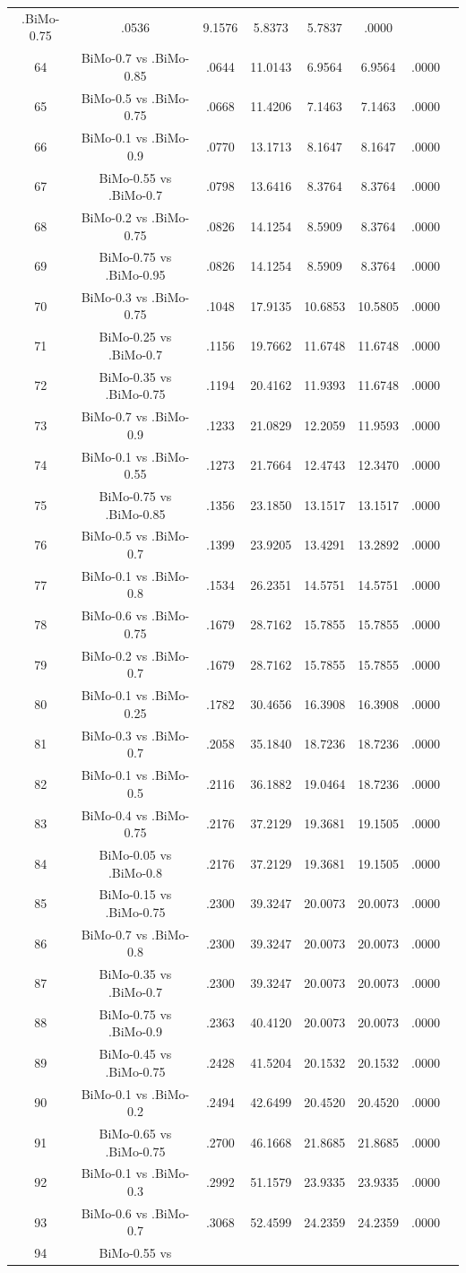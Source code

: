 \documentclass[a4paper,10pt]{article}
\begin{document}
\begin{landscape}
\begin{table}[!htp]
\begin{tabular}{cccccccc}
.BiMo-0.75&.0536&9.1576&5.8373&5.7837&.0000\\64&BiMo-0.7 vs .BiMo-0.85&.0644&11.0143&6.9564&6.9564&.0000\\65&BiMo-0.5 vs .BiMo-0.75&.0668&11.4206&7.1463&7.1463&.0000\\66&BiMo-0.1 vs .BiMo-0.9&.0770&13.1713&8.1647&8.1647&.0000\\67&BiMo-0.55 vs .BiMo-0.7&.0798&13.6416&8.3764&8.3764&.0000\\68&BiMo-0.2 vs .BiMo-0.75&.0826&14.1254&8.5909&8.3764&.0000\\69&BiMo-0.75 vs .BiMo-0.95&.0826&14.1254&8.5909&8.3764&.0000\\70&BiMo-0.3 vs .BiMo-0.75&.1048&17.9135&10.6853&10.5805&.0000\\71&BiMo-0.25 vs .BiMo-0.7&.1156&19.7662&11.6748&11.6748&.0000\\72&BiMo-0.35 vs .BiMo-0.75&.1194&20.4162&11.9393&11.6748&.0000\\73&BiMo-0.7 vs .BiMo-0.9&.1233&21.0829&12.2059&11.9593&.0000\\74&BiMo-0.1 vs .BiMo-0.55&.1273&21.7664&12.4743&12.3470&.0000\\75&BiMo-0.75 vs .BiMo-0.85&.1356&23.1850&13.1517&13.1517&.0000\\76&BiMo-0.5 vs .BiMo-0.7&.1399&23.9205&13.4291&13.2892&.0000\\77&BiMo-0.1 vs .BiMo-0.8&.1534&26.2351&14.5751&14.5751&.0000\\78&BiMo-0.6 vs .BiMo-0.75&.1679&28.7162&15.7855&15.7855&.0000\\79&BiMo-0.2 vs .BiMo-0.7&.1679&28.7162&15.7855&15.7855&.0000\\80&BiMo-0.1 vs .BiMo-0.25&.1782&30.4656&16.3908&16.3908&.0000\\81&BiMo-0.3 vs .BiMo-0.7&.2058&35.1840&18.7236&18.7236&.0000\\82&BiMo-0.1 vs .BiMo-0.5&.2116&36.1882&19.0464&18.7236&.0000\\83&BiMo-0.4 vs .BiMo-0.75&.2176&37.2129&19.3681&19.1505&.0000\\84&BiMo-0.05 vs .BiMo-0.8&.2176&37.2129&19.3681&19.1505&.0000\\85&BiMo-0.15 vs .BiMo-0.75&.2300&39.3247&20.0073&20.0073&.0000\\86&BiMo-0.7 vs .BiMo-0.8&.2300&39.3247&20.0073&20.0073&.0000\\87&BiMo-0.35 vs .BiMo-0.7&.2300&39.3247&20.0073&20.0073&.0000\\88&BiMo-0.75 vs .BiMo-0.9&.2363&40.4120&20.0073&20.0073&.0000\\89&BiMo-0.45 vs .BiMo-0.75&.2428&41.5204&20.1532&20.1532&.0000\\90&BiMo-0.1 vs .BiMo-0.2&.2494&42.6499&20.4520&20.4520&.0000\\91&BiMo-0.65 vs .BiMo-0.75&.2700&46.1668&21.8685&21.8685&.0000\\92&BiMo-0.1 vs .BiMo-0.3&.2992&51.1579&23.9335&23.9335&.0000\\93&BiMo-0.6 vs .BiMo-0.7&.3068&52.4599&24.2359&24.2359&.0000\\94&BiMo-0.55 vs 
\end{tabular}
\end{table}
\end{landscape}
\end{document}
